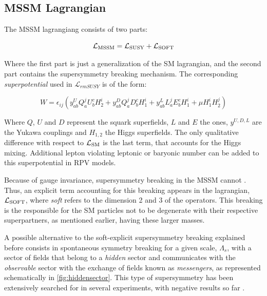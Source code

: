 \subsection{MSSM Lagrangian}
\label{sec:MSSMLag}
The MSSM lagrangiang consists of two parts:

\begin{equation}
\mathcal{L}_{\rm MSSM} = \mathcal{L}_{\rm SUSY} + \mathcal{L}_{\rm SOFT}
\end{equation}

Where the first part is just a generalization of the SM lagrangian, and the second part contains the supersymmetry breaking mechanism. 
The corresponding \textit{superpotential} used in $\mathcal{L}_{rm SUSY}$ is of the form:

\begin{equation}
W = \epsilon_{ij}(y_{ab}^{U}Q_a^jU_b^cH_2^i + y_{ab}^{D}Q_a^j D_b^c H_1^i + y_{ab}^{L} L_a^j E_b^c H_1^i + \mu H_1^i H_2^j)
\label{eq:superpotential}
\end{equation}

Where $Q$, $U$ and $D$ represent the squark superfields, $L$ and $E$ the  ones, $y^{U,D,L}$ are the Yukawa couplings and $H_{1,2}$ the Higgs superfields. The only qualitative difference with respect to $\mathcal{L}_{\rm SM}$ is the last term, that accounts for the Higgs mixing. Additional lepton violating leptonic or baryonic number can be added to this superpotential in RPV models. 

Because of gauge invariance, supersymmetry breaking in the MSSM cannot . Thus, an explicit term accounting for this breaking appears in the lagrangian, $\mathcal{L}_{\rm SOFT}$, where \textit{soft} refers to the dimension 2 and 3 of the operators.  This breaking is the responsible for the SM particles not to be degenerate with their respective superpartners, as mentioned earlier, having these larger masses.  

A possible alternative to the soft-explicit supersymmetry breaking explained before consists in spontaneous symmetry breaking for a given scale, $\Lambda_s$, with a sector of fields that belong to a \textit{hidden} sector and communicates with the \textit{observable} sector with the exchange of fields known as \textit{messengers}, as represented schematically in \ref{fig:hiddensector}. This type of supersymmetry has been extensively searched for in several experiments, with negative results so far .

